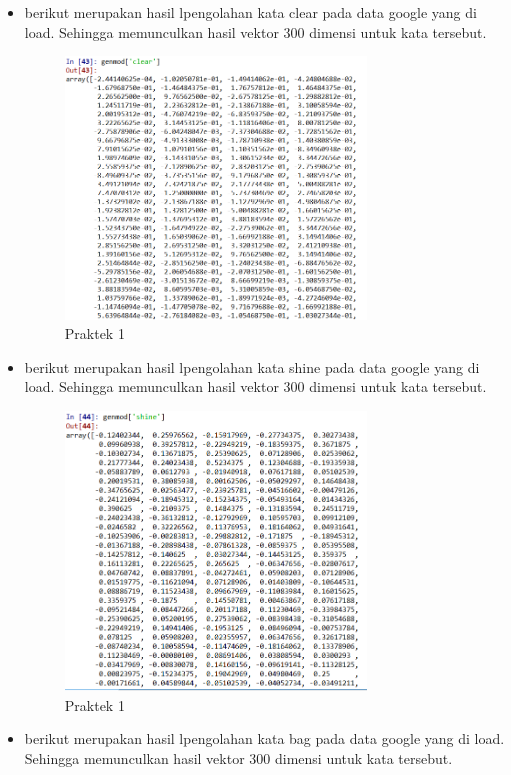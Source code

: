 \begin{enumerate}
\begin{itemize}
\item berikut merupakan hasil lpengolahan kata clear pada data google yang di load. Sehingga memunculkan hasil vektor 300 dimensi untuk kata tersebut.

\begin{figure}[H]
    \includegraphics[width=8cm]{figures/1174084/5/6.png}
    \centering
    \caption{Praktek 1}
\end{figure}

\item berikut merupakan hasil lpengolahan kata shine pada data google yang di load. Sehingga memunculkan hasil vektor 300 dimensi untuk kata tersebut. 

\begin{figure}[H]
    \includegraphics[width=8cm]{figures/1174084/5/7.png}
    \centering
    \caption{Praktek 1}
\end{figure}

\item berikut merupakan hasil lpengolahan kata bag pada data google yang di load. Sehingga memunculkan hasil vektor 300 dimensi untuk kata tersebut.


\end{itemize}
\end{enumerate}
